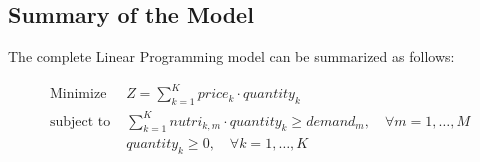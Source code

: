\documentclass{article}
\begin{document}
\subsection*{Summary of the Model}
The complete Linear Programming model can be summarized as follows:

\begin{align*}
\text{Minimize } & Z = \sum_{k=1}^{K} price_k \cdot quantity_k \\
\text{subject to } & \sum_{k=1}^{K} nutri_{k,m} \cdot quantity_k \geq demand_m, \quad \forall m = 1, \ldots, M \\
& quantity_k \geq 0, \quad \forall k = 1, \ldots, K
\end{align*}
\end{document}
